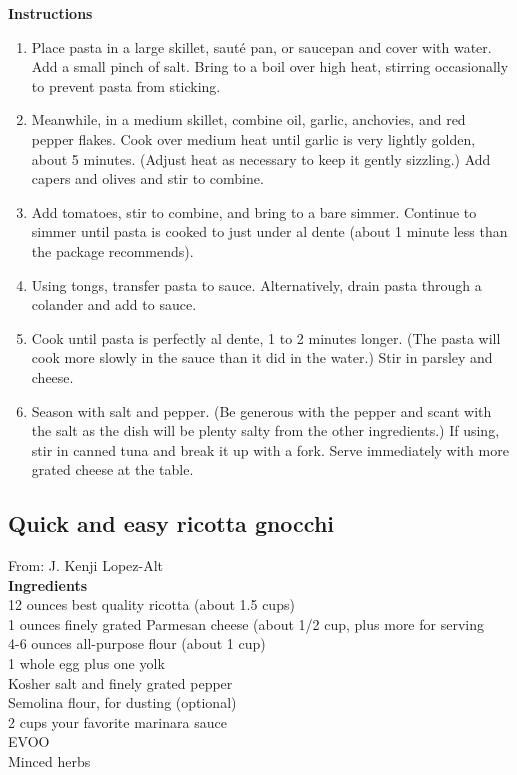 \documentclass{article}
\numberwithin{figure}{section}
\numberwithin{equation}{section}
\begin{document}
{\bf Instructions}
\begin{enumerate}
\item Place pasta in a large skillet, sauté pan, or saucepan and cover with water. Add a small pinch of salt. Bring to a boil over high heat, stirring occasionally to prevent pasta from sticking.
\item Meanwhile, in a medium skillet, combine oil, garlic, anchovies, and red pepper flakes. Cook over medium heat until garlic is very lightly golden, about 5 minutes. (Adjust heat as necessary to keep it gently sizzling.) Add capers and olives and stir to combine.
\item Add tomatoes, stir to combine, and bring to a bare simmer. Continue to simmer until pasta is cooked to just under al dente (about 1 minute less than the package recommends).
\item Using tongs, transfer pasta to sauce. Alternatively, drain pasta through a colander and add to sauce.
\item Cook until pasta is perfectly al dente, 1 to 2 minutes longer. (The pasta will cook more slowly in the sauce than it did in the water.) Stir in parsley and cheese.
\item Season with salt and pepper. (Be generous with the pepper and scant with the salt as the dish will be plenty salty from the other ingredients.) If using, stir in canned tuna and break it up with a fork. Serve immediately with more grated cheese at the table.
\end{enumerate}

\pagebreak
\subsection{Quick and easy ricotta gnocchi}
From: J. Kenji Lopez-Alt\\

{\bf Ingredients}\\
12 ounces best quality ricotta (about 1.5 cups)\\
1 ounces finely grated Parmesan cheese (about 1/2 cup, plus more for serving\\
4-6 ounces all-purpose flour (about 1 cup)\\
1 whole egg plus one yolk\\
Kosher salt and finely grated pepper\\
Semolina flour, for dusting (optional)\\
2 cups your favorite marinara sauce\\
EVOO\\
Minced herbs\\
\end{document}
